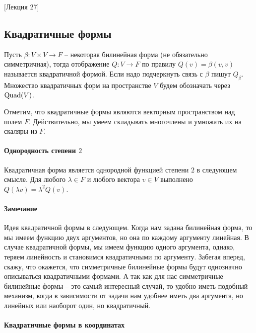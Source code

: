 [Лекция 27]


\subsection{Квадратичные формы}

\begin{definition}
Пусть $\beta\colon V\times V\to F$ -- некоторая билинейная форма (не обязательно симметричная), тогда отображение $Q\colon V\to F$ по правилу $Q(v) = \beta(v, v)$ называется квадратичной формой.
Если надо подчеркнуть связь с $\beta$ пишут $Q_\beta$.
 Множество квадратичных форм на пространстве $V$ будем обозначать через $\operatorname{Quad}(V)$.
\end{definition}

Отметим, что квадратичные формы являются векторным пространством над полем $F$.
Действительно, мы умеем складывать многочлены и умножать их на скаляры из $F$.

\paragraph{Однородность степени $2$}

Квадратичная форма является однородной функцией степени $2$ в следующем смысле.
Для любого $\lambda\in F$ и любого вектора $v\in V$ выполнено $Q(\lambda v) = \lambda^2 Q(v)$.

\paragraph{Замечание}

Идея квадратичной формы в следующем.
Когда нам задана билинейная форма, то мы имеем функцию двух аргументов, но она по каждому аргументу линейная.
В случае квадратичной формы, мы имеем функцию одного аргумента, однако, теряем линейность и становимся квадратичными по аргументу.
Забегая вперед, скажу, что окажется, что симметричные билинейные формы будут однозначно описываться квадратичными формами.
А так как для нас симметричные билинейные формы -- это самый интересный случай, то удобно иметь подобный механизм, когда в зависимости от задачи нам удобнее иметь два аргумента, но линейных или наоборот один, но квадратичный.

\paragraph{Квадратичные формы в координатах}

